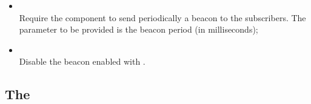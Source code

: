 \begin{enumerate}
\begin{itemize}
            \item {} \\
                Require the  component to send periodically a
                beacon to the subscribers. The parameter to be provided is
                the beacon period (in milliseconds);

            \item {} \\
                Disable the beacon enabled with .

            \end{itemize}

        \end{enumerate}

\subsection{The  }

